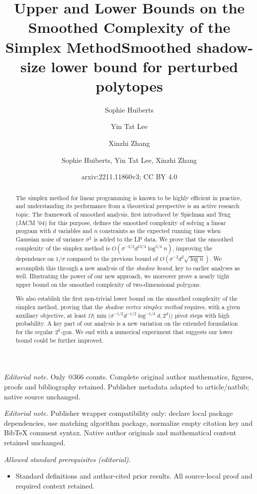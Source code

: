 \documentclass{article}\usepackage[a4paper,margin=20mm]{geometry}
\title{Upper and Lower Bounds on the Smoothed Complexity of the Simplex Method}
\author{Sophie Huiberts \and Yin Tat Lee \and Xinzhi Zhang}\date{}
\title{Smoothed shadow-size lower bound for perturbed polytopes}
\author{Sophie Huiberts, Yin Tat Lee, Xinzhi Zhang}
\date{arxiv:2211.11860v3; CC BY 4.0}
\begin{document}
\maketitle
\noindent\textit{Editorial note.} Only @366 counts. Complete original author mathematics, figures, proofs and bibliography retained. Publisher metadata adapted to article/natbib; native source unchanged.\par\medskip
\noindent\textit{Editorial note.} Publisher wrapper compatibility only: declare local package dependencies, use matching algorithm package, normalize empty citation key and BibTeX comment syntax. Native author originals and mathematical content retained unchanged.\par\medskip
\noindent\textit{Allowed standard prerequisites (editorial).}\begin{itemize}
\item Standard definitions and author-cited prior results. All source-local proof and required context retained.
\end{itemize}\medskip

\maketitle

\begin{abstract}
The simplex method for linear programming is known to be highly efficient in practice,
and understanding its performance from a theoretical perspective is an active research topic.
The framework of smoothed analysis, first introduced by Spielman and Teng (JACM '04)
for this purpose, defines the smoothed complexity of solving a linear program
with $d$ variables and $n$ constraints as the expected running time when
Gaussian noise of variance $\sigma^2$ is added to the LP data.
We prove that the smoothed complexity of the simplex method is
$O(\sigma^{-3/2} d^{13/4}\log^{5/4} n)$,
improving the dependence on $1/\sigma$ compared to the previous bound of
$O(\sigma^{-2} d^2\sqrt{\log n})$.
We accomplish this through a new analysis of the \emph{shadow bound},
key to earlier analyses as well.
Illustrating the power of our new approach, we moreover prove a
nearly tight upper bound on the smoothed complexity of two-dimensional
polygons.

We also establish the first non-trivial lower bound on the smoothed complexity
of the simplex method, proving that the \emph{shadow vertex simplex method}
requires, with a given auxiliary objective, at least
$\Omega \Big(\min \big(\sigma^{-1/2} d^{-1/2}\log^{-1/4} d,2^d \big) \Big)$
pivot steps with high probability. A key part of our analysis
is a new variation on the extended formulation for the regular $2^k$-gon.
We end with a numerical experiment that suggests our lower bound could
be further improved.
\end{abstract}
\end{document}
